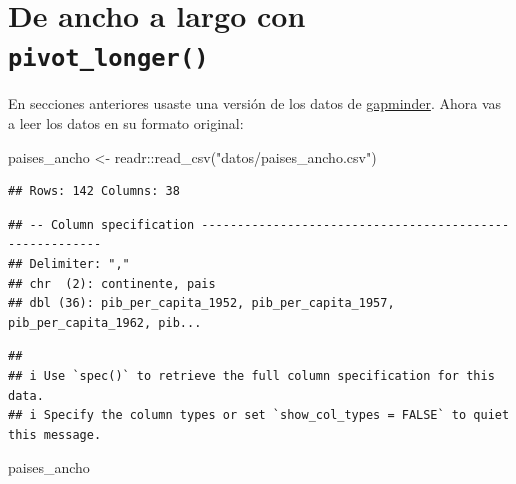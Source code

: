 \documentclass[
  openany]{book}
\newenvironment{Shaded}{\begin{snugshade}}{\end{snugshade}}
\newcommand{\FunctionTok}[1]{\textcolor[rgb]{0.00,0.00,0.00}{#1}}
\newcommand{\NormalTok}[1]{#1}
\newcommand{\OtherTok}[1]{\textcolor[rgb]{0.56,0.35,0.01}{#1}}
\newcommand{\SpecialCharTok}[1]{\textcolor[rgb]{0.00,0.00,0.00}{#1}}
\newcommand{\StringTok}[1]{\textcolor[rgb]{0.31,0.60,0.02}{#1}}
\begin{document}
\hypertarget{de-ancho-a-largo-con-pivot_longer-1}{%
\section{\texorpdfstring{De ancho a largo con \texttt{pivot\_longer()}}{De ancho a largo con pivot\_longer()}}\label{de-ancho-a-largo-con-pivot_longer-1}}

En secciones anteriores usaste una versión de los datos de \href{https://www.gapminder.org/}{gapminder}.
Ahora vas a leer los datos en su formato original:

\begin{Shaded}
\begin{Highlighting}[]
\NormalTok{paises\_ancho }\OtherTok{\textless{}{-}}\NormalTok{ readr}\SpecialCharTok{::}\FunctionTok{read\_csv}\NormalTok{(}\StringTok{"datos/paises\_ancho.csv"}\NormalTok{)}
\end{Highlighting}
\end{Shaded}

\begin{verbatim}
## Rows: 142 Columns: 38
\end{verbatim}

\begin{verbatim}
## -- Column specification --------------------------------------------------------
## Delimiter: ","
## chr  (2): continente, pais
## dbl (36): pib_per_capita_1952, pib_per_capita_1957, pib_per_capita_1962, pib...
\end{verbatim}

\begin{verbatim}
## 
## i Use `spec()` to retrieve the full column specification for this data.
## i Specify the column types or set `show_col_types = FALSE` to quiet this message.
\end{verbatim}

\begin{Shaded}
\begin{Highlighting}[]
\NormalTok{paises\_ancho}
\end{Highlighting}
\end{Shaded}
\end{document}
